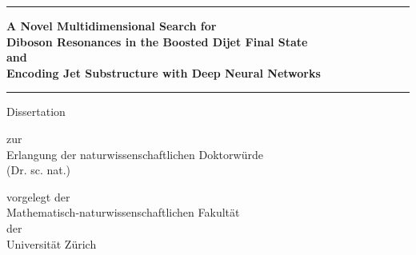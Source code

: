 \begin{center}

  \thispagestyle{empty}
  {\parindent0cm
   \rule{\linewidth}{.4ex}}
  \begin{center}

    \bfseries\large
    A Novel Multidimensional Search for\\ 
    Diboson Resonances in the Boosted Dijet Final State\\
    \vspace{0.2 in}
    and\\
    \vspace{0.2 in}
    Encoding Jet Substructure with Deep Neural Networks\\
  \end{center}
  \rule{\linewidth}{.4ex}

\par
\vspace{0.4 in}

{\large Dissertation}
\vspace{0.1in}

zur \\
Erlangung der 
naturwissenschaftlichen Doktorw\"urde \\
(Dr. sc. nat.) \\
\par
\vspace{0.4in}


vorgelegt der\\
Mathematisch-naturwissenschaftlichen Fakult\"at \\
der \\
\vspace{0.05in}
{\Large Universit\"at Z\"urich}
\par
\vspace{0.3in}


\end{center}
